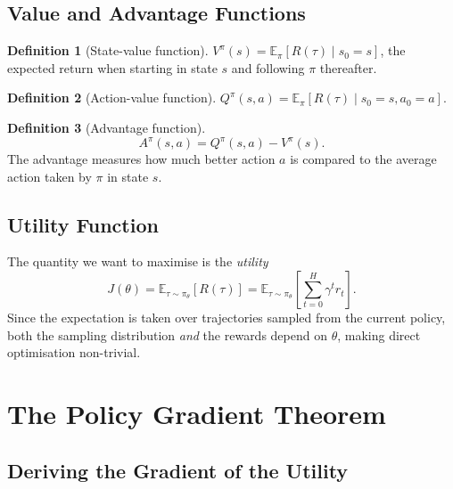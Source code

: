 \documentclass[12pt, a4paper]{article}
\theoremstyle{definition}
\newtheorem{definition}{Definition}[section]
\theoremstyle{plain}
\theoremstyle{remark}
\newcommand{\E}{\mathbb{E}}
\newcommand{\traj}{\tau}
\newcommand{\pith}{\pi_\theta}
\newcommand{\Rtraj}{R(\traj)}
\newcommand{\Jth}{J(\theta)}
\begin{document}
\subsection{Value and Advantage Functions}

\begin{definition}[State-value function]
  $V^\pi(s) = \E_\pi\!\left[\Rtraj \mid s_0 = s\right]$,
  the expected return when starting in state $s$ and following $\pi$ thereafter.
\end{definition}

\begin{definition}[Action-value function]
  $Q^\pi(s, a) = \E_\pi\!\left[\Rtraj \mid s_0 = s, a_0 = a\right]$.
\end{definition}

\begin{definition}[Advantage function]
  \begin{equation}
    A^\pi(s, a) = Q^\pi(s, a) - V^\pi(s).
  \end{equation}
  The advantage measures how much better action $a$ is compared to the average action
  taken by $\pi$ in state $s$.
\end{definition}

\subsection{Utility Function}

The quantity we want to maximise is the \emph{utility}
\begin{equation}
  \Jth = \E_{\traj \sim \pith}\!\left[\Rtraj\right]
       = \E_{\traj \sim \pith}\!\left[\sum_{t=0}^{H} \gamma^t r_t\right].
\end{equation}
Since the expectation is taken over trajectories sampled from the current policy, both
the sampling distribution \emph{and} the rewards depend on $\theta$, making
direct optimisation non-trivial.

\section{The Policy Gradient Theorem}
\label{sec:pg}

\subsection{Deriving the Gradient of the Utility}
\end{document}
